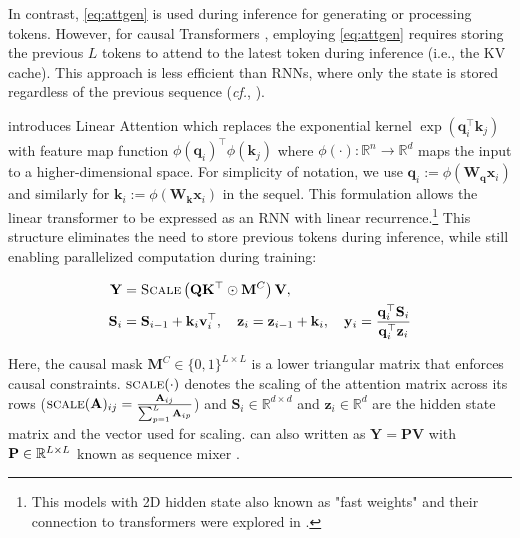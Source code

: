 In contrast, \eqref{eq:attgen} is used during inference for generating or processing tokens. However, for causal Transformers \citep{gpt}, employing \eqref{eq:attgen} requires storing the previous \(L\) tokens to attend to the latest token during inference (i.e., the KV cache). This approach is less efficient than RNNs, where only the state is stored regardless of the previous sequence (\textit{cf.}, \cite{lru}). 


\citet{trans_rnn} introduces Linear Attention which replaces the exponential kernel $\exp (\mathbf{q}_{i}^{\top}\mathbf{k}_{j})$ with feature map function $\phi(\mathbf{q}_{i})^{\top}\phi(\mathbf{k}_{j})$ where $\phi(\cdot): \mathbb{R}^n \rightarrow \mathbb{R}^d$ maps the input to a higher-dimensional space.
For simplicity of notation, we use $\mathbf{q}_i := \phi(\mathbf{W_q} \mathbf{x}_i)$ and similarly for $\mathbf{k}_i:= \phi(\mathbf{W_k}\mathbf{x}_i)$ in the sequel.
This formulation allows the linear transformer to be expressed as an RNN with linear recurrence.\footnote{This models with 2D hidden state also known as "fast weights" \cite{fw1,fw2} and their connection to transformers were explored in \citep{schlag2021linear}.} This structure eliminates the need to store previous tokens during inference, while still enabling parallelized computation during training:

\vspace{-7mm}
\hspace{-2mm}
\begin{minipage}[t]{0.49\textwidth}
\begin{align}\label{equ:linear_attention}
   \mathbf{Y} & = \textsc{Scale}\left(\mathbf{Q} \mathbf{K}^\top  \odot \mathbf{M}^C \right) 
    \mathbf{V}, \\
    \mathbf{S}_i &= \mathbf{S}_{i-1} + \mathbf{k}_i\mathbf{v}_i^\top, \quad  \mathbf{z}_i = \mathbf{z}_{i-1} + \mathbf{k}_i, \quad  \mathbf{y}_i = \frac{\mathbf{q}_i^\top\mathbf{S}_i}{\mathbf{q}_i^\top\mathbf{z}_i}
\end{align} 
\end{minipage}
Here, the causal mask $\mathbf{M}^C \in \{ 0,1 \}^{L\times L}$ is a lower triangular matrix that enforces causal constraints. \(\textsc{scale}(\cdot)\) denotes the scaling of the attention matrix across its rows (\(\textsc{scale}(\mathbf{A})_{ij} = \frac{\mathbf{A}_{ij}}{\sum_{p=1}^L \mathbf{A}_{ip}}\)) and $\mathbf{S}_i \in \mathbb{R}^{d \times d}$ and $\mathbf{z}_i \in \mathbb{R}^{d}$ are the hidden state matrix and the vector used for scaling.  can also written as $\mathbf{Y} = \mathbf{P}\mathbf{V}$ with $\mathbf{P} \in \mathbb{R}^{L\times L}$ known as sequence mixer \cite{hwang2024hydrabidirectionalstatespace}. 

